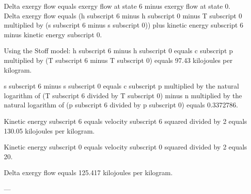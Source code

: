 Delta exergy flow equals exergy flow at state 6 minus exergy flow at state 0.  
Delta exergy flow equals (h subscript 6 minus h subscript 0 minus T subscript 0 multiplied by (s subscript 6 minus s subscript 0)) plus kinetic energy subscript 6 minus kinetic energy subscript 0.  

Using the Stoff model:  
h subscript 6 minus h subscript 0 equals c subscript p multiplied by (T subscript 6 minus T subscript 0) equals 97.43 kilojoules per kilogram.  

s subscript 6 minus s subscript 0 equals c subscript p multiplied by the natural logarithm of (T subscript 6 divided by T subscript 0) minus n multiplied by the natural logarithm of (p subscript 6 divided by p subscript 0) equals 0.3372786.  

Kinetic energy subscript 6 equals velocity subscript 6 squared divided by 2 equals 130.05 kilojoules per kilogram.  

Kinetic energy subscript 0 equals velocity subscript 0 squared divided by 2 equals 20.  

Delta exergy flow equals 125.417 kilojoules per kilogram.  

---